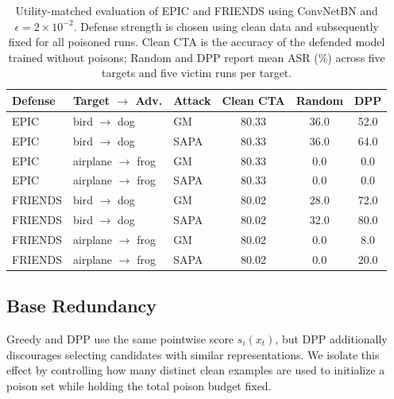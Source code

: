 \begin{table}[t]
\centering
\caption{
Utility-matched evaluation of EPIC and FRIENDS using ConvNetBN and
$\epsilon=2\times10^{-2}$. Defense strength is chosen using clean data
and subsequently fixed for all poisoned runs. Clean CTA is the accuracy
of the defended model trained without poisons; Random and DPP report
mean ASR (\%) across five targets and five victim runs per target.
}
\label{tab:utility-defense}
\small
\setlength{\tabcolsep}{5.5pt}
\renewcommand{\arraystretch}{1.08}
\begin{tabular}{lllccc}
\toprule
\textbf{Defense} &
\textbf{Target $\rightarrow$ Adv.} &
\textbf{Attack} &
\textbf{Clean CTA} &
\textbf{Random} &
\textbf{DPP} \\
\midrule
EPIC &
bird $\rightarrow$ dog &
GM &
80.33 & 36.0 & 52.0 \\

EPIC &
bird $\rightarrow$ dog &
SAPA &
80.33 & 36.0 & 64.0 \\

EPIC &
airplane $\rightarrow$ frog &
GM &
80.33 &  0.0 &  0.0 \\

EPIC &
airplane $\rightarrow$ frog &
SAPA &
80.33 &  0.0 &  0.0 \\

\midrule

FRIENDS &
bird $\rightarrow$ dog &
GM &
80.02 & 28.0 & 72.0 \\

FRIENDS &
bird $\rightarrow$ dog &
SAPA &
80.02 & 32.0 & 80.0 \\

FRIENDS &
airplane $\rightarrow$ frog &
GM &
80.02 &  0.0 &  8.0 \\

FRIENDS &
airplane $\rightarrow$ frog &
SAPA &
80.02 &  0.0 & 20.0 \\
\bottomrule
\end{tabular}
\end{table}


\subsection{Base Redundancy}
\label{sec:base-redundancy}

Greedy and DPP use the same pointwise score $s_i(x_t)$, but DPP
additionally discourages selecting candidates with similar
representations. We isolate this effect by controlling how many distinct
clean examples are used to initialize a poison set while holding the
total poison budget fixed.

